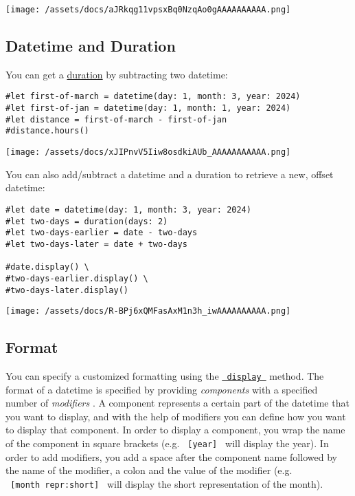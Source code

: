 \texttt{[image: /assets/docs/aJRkqg11vpsxBq0NzqAo0gAAAAAAAAAA.png]}

\subsection{Datetime and Duration}\label{datetime-and-duration}

You can get a \href{/docs/reference/foundations/duration/}{duration} by
subtracting two datetime:

\begin{verbatim}
#let first-of-march = datetime(day: 1, month: 3, year: 2024)
#let first-of-jan = datetime(day: 1, month: 1, year: 2024)
#let distance = first-of-march - first-of-jan
#distance.hours()
\end{verbatim}

\texttt{[image: /assets/docs/xJIPnvV5Iiw8osdkiAUb\_AAAAAAAAAAA.png]}

You can also add/subtract a datetime and a duration to retrieve a new,
offset datetime:

\begin{verbatim}
#let date = datetime(day: 1, month: 3, year: 2024)
#let two-days = duration(days: 2)
#let two-days-earlier = date - two-days
#let two-days-later = date + two-days

#date.display() \
#two-days-earlier.display() \
#two-days-later.display()
\end{verbatim}

\texttt{[image: /assets/docs/R-BPj6xQMFasAxM1n3h\_iwAAAAAAAAAA.png]}

\subsection{Format}\label{format}

You can specify a customized formatting using the
\href{/docs/reference/foundations/datetime/\#definitions-display}{\texttt{\ display\ }}
method. The format of a datetime is specified by providing
\emph{components} with a specified number of \emph{modifiers} . A
component represents a certain part of the datetime that you want to
display, and with the help of modifiers you can define how you want to
display that component. In order to display a component, you wrap the
name of the component in square brackets (e.g. \texttt{\ {[}year{]}\ }
will display the year). In order to add modifiers, you add a space after
the component name followed by the name of the modifier, a colon and the
value of the modifier (e.g. \texttt{\ {[}month\ repr:short{]}\ } will
display the short representation of the month).

